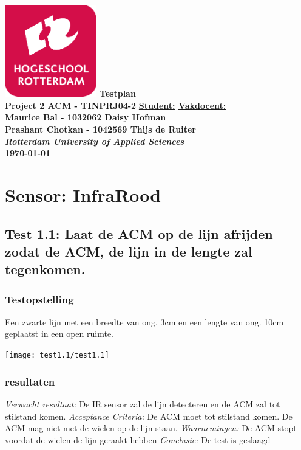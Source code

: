 \documentclass{article}
\begin{document}
\sffamily
\begin{titlepage}
  \centering
    \vfill
    \vfill
    \includegraphics[width=4cm]{logohr} %
    \vfill
    \vfill
    {\bfseries\Huge
      Testplan\\
      Project 2 ACM - TINPRJ04-2
      \vskip6cm
    }
      {
        \bfseries\normalsize
        \textbf{\underline{Student:}}
        \hfill
        \textbf{\underline{Vakdocent:}} \\
        Maurice Bal - 1032062
        \hfill
        Daisy Hofman\\
        Prashant Chotkan - 1042569
        \hfill
        Thijs de Ruiter\\
        \vskip6cm       
      }
      {\bfseries\Large
        \textit{Rotterdam University of Applied Sciences}\\
        \monthyeardate\today\\
      }
    \vfill
    
    \vfill
    \vfill
\end{titlepage}
\newpage
\tableofcontents
\newpage

\section{Sensor: InfraRood}
\subsection{Test 1.1: Laat de ACM op de lijn afrijden zodat de ACM, de lijn in de lengte zal tegenkomen.}
\subsubsection{Testopstelling}
Een zwarte lijn met een breedte van ong. 3cm en een lengte van ong. 10cm geplaatst in een open ruimte. \\
\begin{center}
\texttt{[image: test1.1/test1.1]}
\end{center}
\subsubsection{resultaten}
\textit{Verwacht resultaat: } De IR sensor zal de lijn detecteren en de ACM zal tot stilstand komen.
\newline
\textit{Acceptance Criteria: }De ACM moet tot stilstand komen. De ACM mag niet met de wielen op de lijn staan.
\newline
\textit{Waarnemingen: }De ACM stopt voordat de wielen de lijn geraakt hebben
\newline
\textit{Conclusie: }De test is geslaagd
\end{document}

